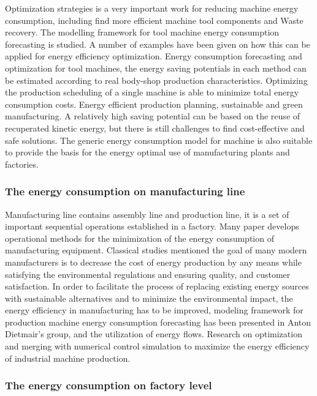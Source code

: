 Optimization strategies is a very important work for reducing machine energy consumption, including find more efficient machine tool components and Waste recovery. The modelling framework for tool machine energy consumption forecasting is studied. A number of examples have been given on how this can be applied for energy efficiency optimization. Energy consumption forecasting and optimization for tool machines,   the energy saving potentials in each method can be estimated according to real body-shop production characteristics. Optimizing the production scheduling of a single machine is able to minimize total energy consumption costs. Energy efficient production planning, sustainable and green manufacturing. A relatively high saving potential can be based on the reuse of recuperated kinetic energy, but there is still challenges to find cost-effective and safe solutions. The generic energy consumption model for machine is also suitable to provide the basis for the energy optimal use of manufacturing plants and factories.




\subsubsection{The energy consumption on manufacturing line }

Manufacturing line contains assembly line and production line, it is a set of important sequential operations established in a factory. Many paper develops operational methods for the minimization of the energy consumption of manufacturing equipment. Classical studies \cite{Gungor1999} mentioned the goal of many modern manufacturers is to decrease the cost of energy production by any means while satisfying the environmental regulations and ensuring quality, and customer satisfaction. In order to facilitate the process of replacing existing energy sources with sustainable alternatives and to minimize the environmental impact, the energy efficiency in manufacturing has to be improved, modeling framework for production machine energy consumption forecasting has been presented in Anton Dietmair’s group, and the utilization of energy flows. Research on optimization and merging with numerical control simulation to maximize the energy efficiency of industrial machine production. 


\subsubsection{The energy consumption on factory level}

